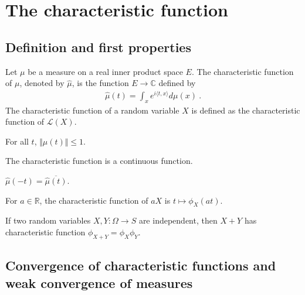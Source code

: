 \chapter{The characteristic function}

\section{Definition and first properties}

\begin{definition}\label{def:charFun}
Let $\mu$ be a measure on a real inner product space $E$. The characteristic function of $\mu$, denoted by $\hat{\mu}$, is the function $E \to \mathbb{C}$ defined by
\begin{align*}
\hat{\mu}(t) = \int_x e^{i \langle t, x \rangle} d\mu(x) \: .
\end{align*}
The characteristic function of a random variable $X$ is defined as the characteristic function of $\mathcal L(X)$.
\end{definition}

\begin{lemma}\label{lem:charFun_bounded}
For all $t$, $\Vert\hat{\mu}(t)\Vert \le 1$.
\end{lemma}

\begin{lemma}\label{lem:charFun_continuous}
The characteristic function is a continuous function.
\end{lemma}

\begin{lemma}\label{lem:charFun_neg}
$\hat{\mu}(-t) = \overline{\hat{\mu}(t)}$.
\end{lemma}

\begin{lemma}\label{lem:charFun_smul}
For $a \in \mathbb{R}$, the characteristic function of $a X$ is $t \mapsto \phi_X(at)$.
\end{lemma}

\begin{lemma}\label{lem:charFun_add_of_indep}
If two random variables $X, Y : \Omega \to S$ are independent, then $X+Y$ has characteristic function $\phi_{X+Y} = \phi_X \phi_Y$. 
\end{lemma}

\section{Convergence of characteristic functions and weak convergence of measures}

